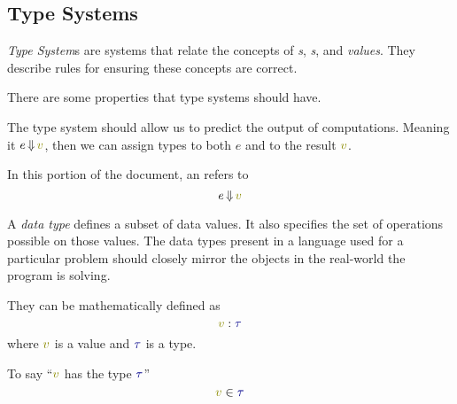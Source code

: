 \subsection{Type Systems}\label{subsec:Type_Systems}
\begin{definition}\label{def:Type_System}
  \emph{Type System}s are systems that relate the concepts of \emph{s}, \emph{s}, and \emph{values}.
  They describe rules for ensuring these concepts are correct.

  There are some properties that type systems should have.
  \begin{propertylist}
  \item The type system should allow us to predict the output of computations. Meaning it $e \EvaluatesTo \SemanticValue{v}$, then we can assign types to both $e$ and to the result $\SemanticValue{v}$.
  \end{propertylist}

  \begin{remark}[Expressions]
    In this portion of the document, an  refers to
    \begin{equation*}
      e \EvaluatesTo \SemanticValue{v}
    \end{equation*}
  \end{remark}
\end{definition}

\begin{definition}\label{def:Data_Type}
  A \emph{data type} defines a subset of data values.
  It also specifies the set of operations possible on those values.
  The data types present in a language used for a particular problem should closely mirror the objects in the real-world the program is solving.

  They can be mathematically defined as
  \begin{equation}\label{eq:Data_Type}
    \SemanticValue{v} : \DataType
  \end{equation}
  where $\SemanticValue{v}$ is a value and $\DataType$ is a type.

  \begin{remark}\label{rmk:Has_the_Type}
    To say ``$\SemanticValue{v}$ has the type $\DataType$''
    \begin{equation}\label{eq:Has_the_Type}
      \SemanticValue{v} \in \DataType
    \end{equation}
  \end{remark}
\end{definition}

